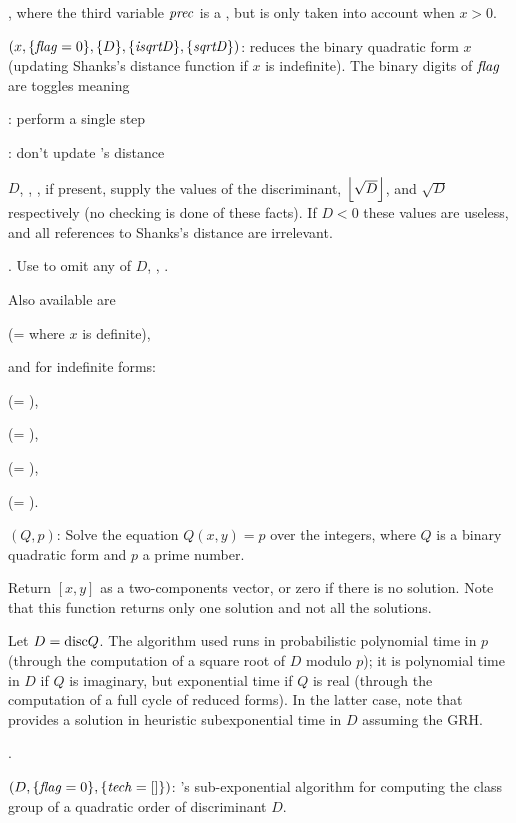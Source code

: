 , where the third variable $\hbox{\it prec\/}$ is a
, but is only taken into account when $x>0$.

$(x,\{\hbox{\it f\kern0pt lag\/}=0\},\{D\},\{\hbox{\it isqrtD\/}\},\{\hbox{\it sqrtD\/}\})$:
reduces the binary quadratic form $x$ (updating Shanks's distance function
if $x$ is indefinite). The binary digits of $\hbox{\it f\kern0pt lag\/}$ are toggles meaning

: perform a single  step

: don't update 's distance

  $D$, , , if present, supply the values of the
discriminant, $\left\lfloor \sqrt{D} \right\rfloor$, and $\sqrt{D}$ respectively
(no checking is done of these facts). If $D<0$ these values are useless,
and all references to Shanks's distance are irrelevant.

. Use 
to omit any of $D$, , .

\noindent Also available are

 (=  where $x$ is definite),

\noindent and for indefinite forms:

 (= ),

 (= ),

 (= ),

 (= ).

$(Q,p)$: Solve the equation $Q(x,y)=p$ over the integers,
where $Q$ is a binary quadratic form and $p$ a prime number.

Return $[x,y]$ as a two-components vector, or zero if there is no solution.
Note that this function returns only one solution and not all the solutions.

Let $D = {\rm disc} Q$. The algorithm used runs in probabilistic polynomial time
in $p$ (through the computation of a square root of $D$ modulo $p$); it is
polynomial time in $D$ if $Q$ is imaginary, but exponential time if $Q$ is
real (through the computation of a full cycle of reduced forms). In the
latter case, note that  provides a solution in heuristic
subexponential time in $D$ assuming the GRH.

.

$(D,\{\hbox{\it f\kern0pt lag\/}=0\},\{\hbox{\it tech\/}=[]\})$:
's sub-exponential algorithm for computing the class
group of a quadratic order of discriminant $D$.

